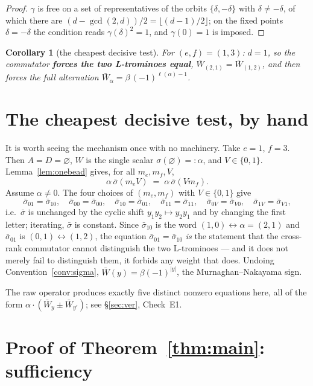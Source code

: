 \documentclass[11pt]{article}
\newtheorem{corollary}[theorem]{Corollary}
\theoremstyle{definition}
\theoremstyle{remark}
\begin{document}
\begin{proof}
$\gamma$ is free on a set of representatives of the orbits $\{\delta,-\delta\}$ with
$\delta\ne-\delta$, of which there are $(d-\gcd(2,d))/2=\lfloor(d-1)/2\rfloor$; on the
fixed points $\delta=-\delta$ the condition reads $\gamma(\delta)^2=1$, and
$\gamma(0)=1$ is imposed.
\end{proof}

\begin{corollary}[the cheapest decisive test]\label{cor:cheap}
For $(e,f)=(1,3)$: $d=1$, so the commutator \textbf{forces the two L-trominoes equal},
$\bar W_{(2,1)}=\bar W_{(1,2)}$, and then forces the full alternation
$\bar W_{\alpha}=\beta\,(-1)^{\ell(\alpha)-1}$.
\end{corollary}

\section{The cheapest decisive test, by hand}\label{sec:cheap}

It is worth seeing the mechanism once with no machinery.  Take $e=1$, $f=3$.  Then
$A=D=\varnothing$, $W$ is the single scalar $\sigma(\varnothing)=:\alpha$, and
$V\in\{0,1\}$.  Lemma~\ref{lem:onebead} gives, for all $m_e,m_f,V$,
\[
   \alpha\,\bar\sigma(m_e V)\;=\;\alpha\,\bar\sigma(V m_f).
\]
Assume $\alpha\ne0$.  The four choices of $(m_e,m_f)$ with $V\in\{0,1\}$ give
\[
  \bar\sigma_{01}=\bar\sigma_{10},\quad
  \bar\sigma_{00}=\bar\sigma_{00},\quad
  \bar\sigma_{10}=\bar\sigma_{01},\quad
  \bar\sigma_{11}=\bar\sigma_{11},\quad
  \bar\sigma_{0V}=\bar\sigma_{V0},\quad \bar\sigma_{1V}=\bar\sigma_{V1},
\]
i.e.\ $\bar\sigma$ is unchanged by the cyclic shift $y_1y_2\mapsto y_2y_1$ and by
changing the first letter; iterating, $\bar\sigma$ is constant.  Since
$\bar\sigma_{10}$ is the word $(1,0)\leftrightarrow\alpha=(2,1)$ and $\bar\sigma_{01}$ is
$(0,1)\leftrightarrow(1,2)$, the equation $\bar\sigma_{01}=\bar\sigma_{10}$ \emph{is} the
statement that the cross-rank commutator cannot distinguish the two L-trominoes --- and
it does not merely fail to distinguish them, it forbids any weight that does.  Undoing
Convention~\ref{conv:sigma}, $\bar W(y)=\beta(-1)^{|y|}$, the Murnaghan--Nakayama sign.

The raw operator produces exactly five distinct nonzero equations here, all of the form
$\alpha\cdot(\bar W_{y}\pm\bar W_{y'})$; see \S\ref{sec:ver}, Check~E1.

\section{Proof of Theorem~\ref{thm:main}: sufficiency}
\end{document}
